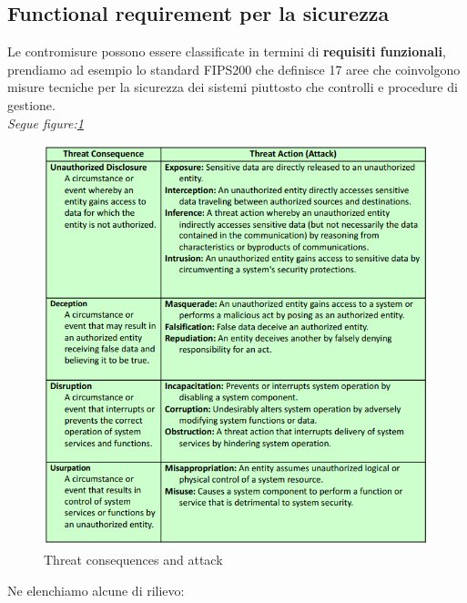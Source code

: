 \documentclass[12pt]{article}
\begin{document}
		\subsection{Functional requirement per la sicurezza}
				Le contromisure possono essere classificate in termini di \textbf{requisiti funzionali}, prendiamo ad esempio lo standard FIPS200 che definisce 17 aree che coinvolgono misure tecniche per la sicurezza dei sistemi piuttosto che controlli e procedure di gestione.\\
				 \textit{Segue figure:\ref{fig:5}}
				\begin{figure}[h!]
					\centering
					\includegraphics[scale=0.60]{img/threat.PNG}
					\caption{Threat consequences and attack\label{fig:5}}
				\end{figure}
				Ne elenchiamo alcune di rilievo:
\end{document}
